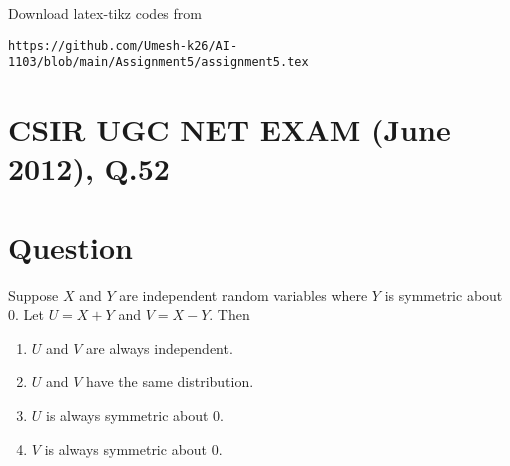 \documentclass[journal,12pt,twocolumn]{IEEEtran}
\begin{document}
Download latex-tikz codes from 
%
\begin{lstlisting}
https://github.com/Umesh-k26/AI-1103/blob/main/Assignment5/assignment5.tex
\end{lstlisting}

\section*{CSIR UGC NET EXAM (June 2012), Q.52}
\section*{Question} Suppose $X$ and $Y$ are independent random variables where $Y$ is symmetric about 0. Let
$U= X+Y$ and $V= X-Y$. Then
\begin{enumerate}
    \item $U$ and $V$ are always independent.
    \item $U$ and $V$ have the same distribution.
    \item $U$ is always symmetric about 0.
    \item $V$ is always symmetric about 0.
\end{enumerate}
\end{document}
